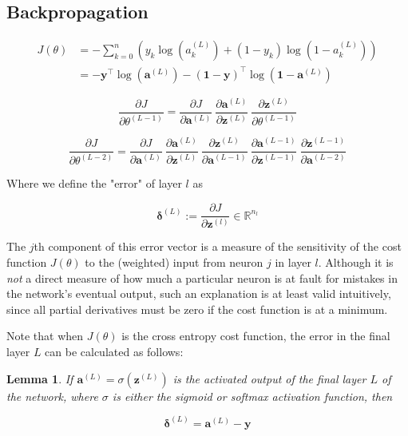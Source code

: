\documentclass{article}
\newtheorem{lemma}{Lemma}
\begin{document}
    \subsection{Backpropagation}
        
        
        $$ \begin{aligned}
        J(\theta) &= - \sum_{k=0}^{n} \left( y_k \log(a^{(L)}_k) + (1 - y_k) \log(1 - a^{(L)}_k) \right) \\
            &= -\mathbf{y}^\top \log(\mathbf{a}^{(L)}) - (\mathbf{1}-\mathbf{y})^\top \log(\mathbf{1} - \mathbf{a}^{(L)})
        \end{aligned} $$
        
        
        
        $$
        \frac{\partial J}{\partial \theta^{(L-1)}} =
            \frac{\partial J}{\partial \mathbf{a}^{(L)}} \
            \frac{\partial \mathbf{a}^{(L)}}{\partial \mathbf{z}^{(L)}} \
            \frac{\partial \mathbf{z}^{(L)}}{\partial \theta^{(L-1)}}
        $$



        $$
        \frac{\partial J}{\partial \theta^{(L-2)}} =
            \frac{\partial J}{\partial \mathbf{a}^{(L)}} \
            \frac{\partial \mathbf{a}^{(L)}}{\partial \mathbf{z}^{(L)}} \
            \frac{\partial \mathbf{z}^{(L)}}{\partial \mathbf{a}^{(L-1)}} \
            \frac{\partial \mathbf{a}^{(L-1)}}{\partial \mathbf{z}^{(L-1)}} \
            \frac{\partial \mathbf{z}^{(L-1)}}{\partial \mathbf{a}^{(L-2)}}
        $$



    Where we define the "error" of layer $l$ as
    
        $$
        \mathbf{\delta}^{(L)} :=  \frac{\partial J}{\partial \mathbf{z}^{(l)}} \in \mathbb{R}^{n_l}
        $$
        
        The $j$th component of this error vector is a measure of the sensitivity of the cost function $J(\theta)$ to the (weighted) input from neuron $j$ in layer $l$. Although it is \textit{not} a direct measure of how much a particular neuron is at fault for mistakes in the network's eventual output, such an explanation is at least valid intuitively, since all partial derivatives must be zero if the cost function is at a minimum.
        
        Note that when $J(\theta)$ is the cross entropy cost function, the error in the final layer $L$ can be calculated as follows:
        
        \begin{lemma}
            If $\mathbf{a}^{(L)} = \sigma(\mathbf{z}^{(L)})$ is the activated output of the final layer $L$ of the network, where $\sigma$ is either the sigmoid or softmax activation function, then
            
            $$
            \mathbf{\delta}^{(L)} = \mathbf{a}^{(L)} - \mathbf{y}
            $$
            
        \end{lemma}
        
\end{document}

